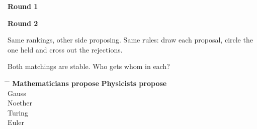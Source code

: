 \vspace{0.2cm}

\begin{minipage}[t]{0.48\linewidth}
\begin{center}
{\large\bfseries Round 1}\\[0.4em]
\end{center}
\end{minipage}
\hfill
\begin{minipage}[t]{0.48\linewidth}
\begin{center}
{\large\bfseries Round 2}\\[0.4em]
\end{center}
\end{minipage}

\vspace{0.5cm}

{\small\color{inkgrey} Same rankings, other side proposing. Same rules: draw each
proposal, circle the one held and cross out the rejections.}

\newpage
{}

\vspace{0.1cm}

{\large Both matchings are stable. Who gets whom in each?}

\vspace{0.35cm}

\hspace{0.6cm}
\begin{minipage}{0.9\linewidth}
{\large
\begin{tabbing}
\hspace{3.6cm} \= \hspace{6.4cm} \= \kill
\> \textbf{Mathematicians propose} \> \textbf{Physicists propose}\\[0.55em]
Gauss \>  \> \\[0.55em]
Noether \>  \> \\[0.55em]
Turing \>  \> \\[0.55em]
Euler \>  \> 
\end{tabbing}}
\end{minipage}

